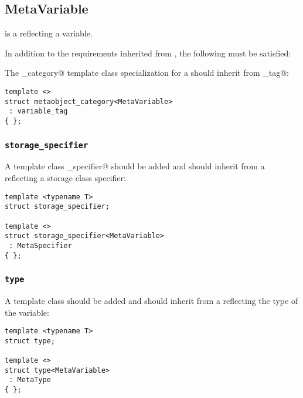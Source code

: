 \subsection{MetaVariable}
\label{concept-MetaVariable}


 is a  reflecting a variable.

In addition to the requirements inherited from , the following must
be satisfied:

The \verb@metaobject_category@ template class specialization for a  should
inherit from \verb@variable_tag@:

\begin{verbatim}
template <>
struct metaobject_category<MetaVariable>
 : variable_tag
{ };
\end{verbatim}

\subsubsection{\texttt{storage\_specifier}}

A template class \verb@storage_specifier@ should be added and should
inherit from a  reflecting a storage class specifier:

\begin{verbatim}
template <typename T>
struct storage_specifier;

template <>
struct storage_specifier<MetaVariable>
 : MetaSpecifier
{ };
\end{verbatim}

\subsubsection{\texttt{type}}

A template class \verb@type@ should be added and should inherit
from a  reflecting the type of the variable:

\begin{verbatim}
template <typename T>
struct type;

template <>
struct type<MetaVariable>
 : MetaType
{ };
\end{verbatim}

